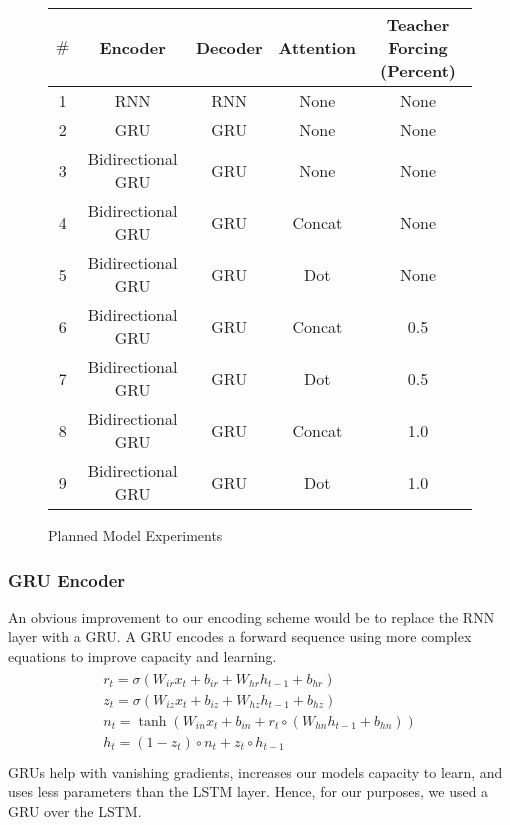 \documentclass[twoside,twocolumn]{article}
\begin{document}
\begin{figure*}[ht]
    \centering
    \begin{tabular}{ |c|c|c|c|c| }
        \hline
        $\#$
          & \textbf{Encoder}
          & \textbf{Decoder}
          & \textbf{Attention}
          & \textbf{Teacher Forcing (Percent)} \\
        \hline
        1 & RNN & RNN & None & None \\ \hline
        2 & GRU & GRU & None & None \\ \hline
        3 & Bidirectional GRU & GRU & None & None \\ \hline
        4 & Bidirectional GRU & GRU & Concat & None \\ \hline
        5 & Bidirectional GRU & GRU & Dot & None \\ \hline
        6 & Bidirectional GRU & GRU & Concat & 0.5 \\ \hline
        7 & Bidirectional GRU & GRU & Dot & 0.5 \\ \hline
        8 & Bidirectional GRU & GRU & Concat & 1.0 \\ \hline
        9 & Bidirectional GRU & GRU & Dot & 1.0 \\ \hline
    \end{tabular}

    \caption{Planned Model Experiments}
    \label{fig:model-experiments}
\end{figure*}

\subsubsection{GRU Encoder}
An obvious improvement to our encoding scheme would be to replace the RNN layer
with a GRU. A GRU encodes a forward sequence using more complex equations to
improve capacity and learning.
\begin{equation}
  \label{eq:gru}
  \begin{split}\begin{array}{ll}
    r_t = \sigma(W_{ir} x_t + b_{ir} + W_{hr} h_{t-1} + b_{hr}) \\
    z_t = \sigma(W_{iz} x_t + b_{iz} + W_{hz} h_{t-1} + b_{hz}) \\
    n_t = \tanh(W_{in} x_t + b_{in} + r_t \circ (W_{hn} h_{t-1}+ b_{hn})) \\
    h_t = (1 - z_t) \circ n_t + z_t \circ h_{t-1} \\
  \end{array}\end{split}
\end{equation}
GRUs help with vanishing gradients, increases our models capacity to learn,
and uses less parameters than the LSTM layer. Hence, for our purposes, we
used a GRU over the LSTM.
\end{document}
